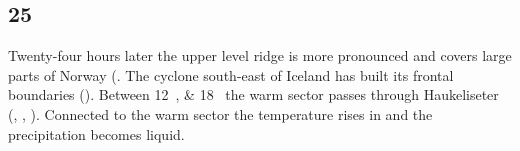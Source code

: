 \subsection*{\SI{25}{\dec}}
Twenty-four hours later the upper level ridge is more pronounced and covers large parts of Norway (. The cyclone south-east of Iceland has built its frontal boundaries (). Between \SIlist{12;18}{\UTC} the warm sector passes through Haukeliseter (, , ). Connected to the warm sector the temperature rises in  and the precipitation becomes liquid. 

